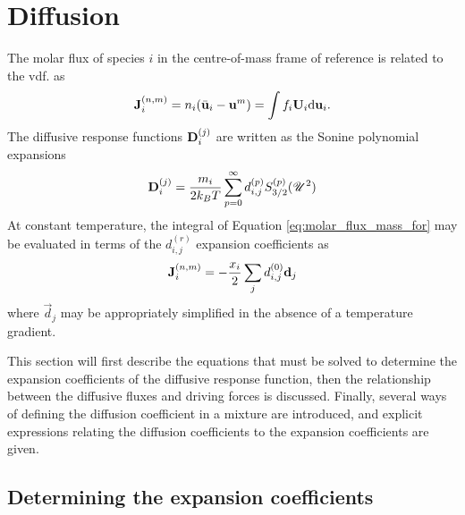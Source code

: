\section{Diffusion}

The molar flux of species $i$ in the centre-of-mass frame of reference is related to the vdf. as
\begin{equation}
    \boldsymbol{\mathrm{J}}^{(n,m)}_i = n_i (\Bar{\boldsymbol{\mathrm{u}}}_i - \boldsymbol{\mathrm{u}}^m) = \int f_i \boldsymbol{\mathrm{U}}_i \mathrm{d} \boldsymbol{\mathrm{u}}_i.
    \label{eq:molar_flux_mass_for}
\end{equation}
The diffusive response functions $\boldsymbol{\mathrm{D}}_i^{(j)}$ are written as the Sonine polynomial expansions
\begin{equation}
    \boldsymbol{\mathrm{D}}_i^{(j)} = \frac{m_i}{2 k_B T} \sum_{p = 0}^\infty d_{i, j}^{(p)} S_{3/2}^{(p)}(\mathscr{U}^2)
\end{equation}
At constant temperature, the integral of Equation \eqref{eq:molar_flux_mass_for} may be evaluated in terms of the $d_{i,j}^{(r)}$ expansion coefficients as
\begin{equation}
    \boldsymbol{\mathrm{J}}^{(n,m)}_i = - \frac{x_i}{2} \sum_j d_{i, j}^{(0)} \boldsymbol{\mathrm{d}}_j
\end{equation}
where $\Vec{d}_j$ may be appropriately simplified in the absence of a temperature gradient.

This section will first describe the equations that must be solved to determine the expansion coefficients of the diffusive response function, then the relationship between the diffusive fluxes and driving forces is discussed. Finally, several ways of defining the diffusion coefficient in a mixture are introduced, and explicit expressions relating the diffusion coefficients to the expansion coefficients are given.

\subsection{Determining the expansion coefficients}
\label{sec:diffusion_exp_coeff}

